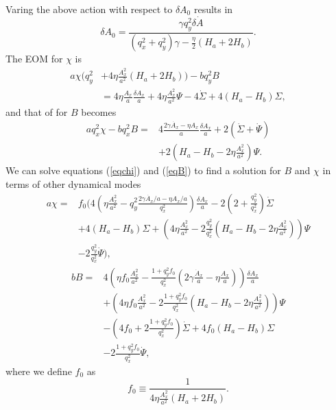 \documentclass[%
 reprint,
 amsmath,amssymb,
 aps,
]{revtex4-1}
\begin{document}
Varing the above action with respect to $\delta A_0$ results in
\begin{equation}
\delta A_0=\frac{\gamma q_y^2\delta\dot{A}}{(q_x^2+q_y^2)\gamma-\frac{\eta}{2}(H_a+2H_b)}.
\end{equation}
The EOM for $\chi$ is
\begin{equation}\label{eqchi}
\begin{split}
a\chi(q_y^2&+4\eta\frac{A_x^2}{a^2}(H_a+2H_b))-bq_y^2B\\
&=4\eta\frac{A_x}{a}\frac{\delta A_x}{a}+4\eta\frac{A_x^2}{a^2}\Psi-4\dot{\Sigma}
+4(H_a-H_b)\Sigma,
\end{split}
\end{equation}
and that of for $B$ becomes
\begin{equation}\label{eqB}
\begin{split}
aq_x^2\chi-bq_x^2B=&4\frac{2\gamma\dot{A_x}-\eta A_x}{a}\frac{\delta A_x}{a}+2(\dot{\Sigma}+\dot{\Psi})\\
&+2(H_a-H_b-2\eta\frac{A_x^2}{a^2})\Psi.
\end{split}
\end{equation}
We can solve equations (\ref{eqchi}) and (\ref{eqB}) to find a solution for $B$ and $\chi$ in terms of  other dynamical modes
\begin{equation}
\begin{split}
a\chi=&f_0\biggl(4(\eta\frac{A_x^2}{a^2}-q_y^2\frac{2\gamma\dot{A_x}/a-\eta A_x/a}{q_x^2})\frac{\delta A_x}{a}-2(2+\frac{q_y^2}{q_x^2})\dot{\Sigma}\\
&+4(H_a-H_b)\Sigma+(4\eta\frac{A_x^2}{a^2}-2\frac{q_y^2}{q_x^2}(H_a-H_b-2\eta \frac{A_x^2}{a^2}))\Psi\\
&-2\frac{q_y^2}{q_x^2}\dot{\Psi}\biggr),
\end{split}
\end{equation}
\begin{equation}
\begin{split}
bB=&4(\eta f_0\frac{A_x^2}{a^2}-\frac{1+q_y^2f_0}{q_x^2}(2\gamma\frac{\dot{A}_x}{a}-\eta\frac{A_x}{a}))\frac{\delta A_x}{a}\\
&+(4\eta f_0 \frac{A_x^2}{a^2}-2\frac{1+q_y^2f_0}{q_x^2}(H_a-H_b-2\eta \frac{A_x^2}{a^2}))\Psi\\
&-(4f_0+2\frac{1+q_y^2 f_0}{q_x^2})\dot{\Sigma}+4f_0(H_a-H_b)\Sigma\\
&-2\frac{1+q_y^2f_0}{q_x^2}\dot{\Psi},
\end{split}
\end{equation}
where we define  $f_0$ as
\begin{equation}
f_0\equiv \frac{1}{4\eta\frac{A_x^2}{a^2}(H_a+2H_b)}.
\end{equation}
\end{document}
